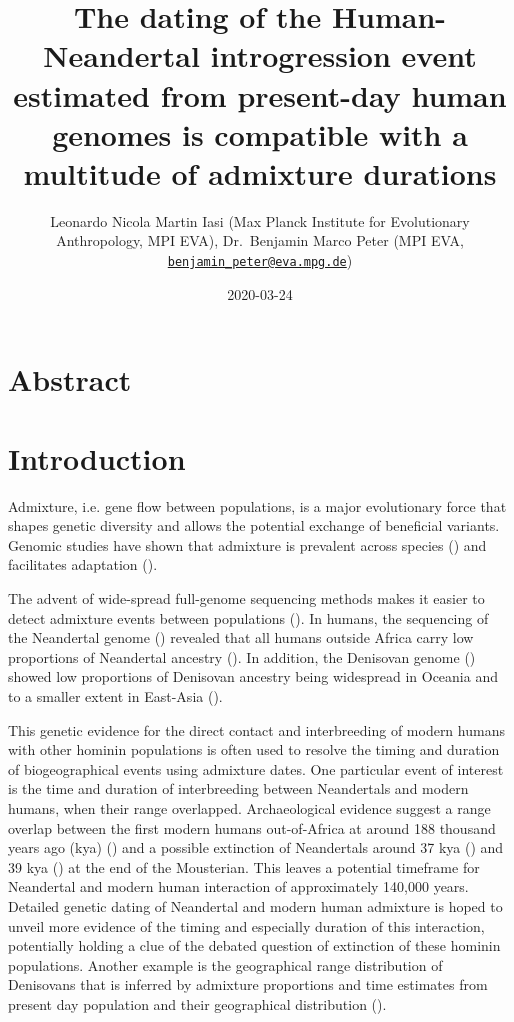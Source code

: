 \documentclass[]{article}
\title{The dating of the Human-Neandertal introgression event estimated from present-day human genomes is compatible with a multitude of admixture durations}
\author{Leonardo Nicola Martin Iasi (Max Planck Institute for Evolutionary
Anthropology, MPI EVA), Dr.~Benjamin Marco Peter (MPI EVA,
\href{mailto:benjamin_peter@eva.mpg.de}{\nolinkurl{benjamin\_peter@eva.mpg.de}})}
\date{2020-03-24}
\begin{document}
\maketitle

\section{Abstract}\label{abstract}

\section{Introduction}\label{introduction}

Admixture, i.e. gene flow between populations, is a major evolutionary force that shapes genetic diversity and allows the potential exchange of beneficial variants. Genomic studies have shown that admixture is prevalent across species (\cite{Salazar_Hybrid_speciation_2010, rieseberg_hybridization_2007,kronforst_multilocus_2006,kolbe_multiple_2007}) and facilitates adaptation (\cite{harrison_hybridization_2014,hedrick_adaptive_2013, shaw_genes_2011,payseur_using_2010}).

The advent of wide-spread full-genome sequencing methods makes it easier to detect admixture events
between populations (\cite{sousa_understanding_2013}). In humans, the sequencing of
the Neandertal genome (\cite{green_draft_2010}) revealed that all humans outside Africa carry low proportions of Neandertal ancestry
(\cite{green_draft_2010,prufer_complete_2013,vernot_resurrecting_2014,fu_early_2015,fu_genome_2014,sankararaman_genomic_2014,prufer_high-coverage_2017}). In addition, the  Denisovan genome (\cite{reich_genetic_2010})
showed low proportions of Denisovan ancestry being widespread in Oceania and to a smaller extent in East-Asia
(\cite{reich_genetic_2010,meyer_high-coverage_2012,sankararaman_combined_2016,vernot_excavating_2016,malaspinas_genomic_2016}).



This genetic evidence for the direct contact and interbreeding of modern humans with other hominin populations is often used to resolve the timing and duration of biogeographical events using admixture dates. One particular event of interest is the time and duration of interbreeding between Neandertals and modern humans, when their range overlapped. Archaeological evidence suggest a range overlap between the first modern humans out-of-Africa at around 188 thousand years ago (kya) (\cite{stringer_when_2018,hershkovitz_earliest_2018}) and a possible extinction of Neandertals around 37 kya (\cite{zilhao_precise_2017}) and 39 kya (\cite{higham_timing_2014}) at the end of the Mousterian. This leaves a potential timeframe for Neandertal and modern human interaction of approximately 140,000 years. Detailed genetic dating of Neandertal and modern human admixture is hoped to unveil more evidence of the timing and especially duration of this interaction,
potentially holding a clue of the debated question of extinction of these hominin populations. Another example is the geographical range distribution of Denisovans that is inferred by admixture proportions and time estimates from present day population and their geographical distribution (\cite{jacobs_multiple_2019}). 
\end{document}
